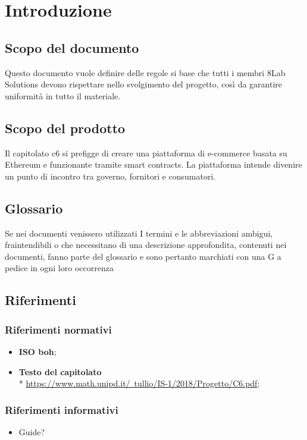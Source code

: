 \section{Introduzione}
\subsection{Scopo del documento}
Questo documento vuole definire delle regole si base che tutti i membri 8Lab
Solutions devono rispettare nello svolgimento del progetto, così da garantire
uniformità in tutto il materiale.
\subsection{Scopo del prodotto}
Il capitolato c6 si prefigge di creare una piattaforma di e-commerce basata su Ethereum e funzionante tramite smart contracts. La piattaforma intende divenire un punto di incontro tra governo, fornitori e consumatori.
\subsection{Glossario}
Se nei documenti venissero utilizzati I termini e le abbreviazioni ambigui,
fraintendibili o che necessitano di una descrizione approfondita, contenuti nei documenti, fanno parte del glossario e sono pertanto marchiati con una G a pedice in ogni loro occorrenza
\subsection{Riferimenti}
\subsubsection{Riferimenti normativi}
\begin{itemize}
\item \textbf{ISO boh}; %
\item \textbf{Testo del capitolato} \\*  \href{https://www.math.unipd.it/~tullio/IS-1/2018/Progetto/C6.pdf}{https://www.math.unipd.it/~tullio/IS-1/2018/Progetto/C6.pdf};
\end{itemize}
\subsubsection{Riferimenti informativi}
\begin{itemize}
\item Guide?
\end{itemize}